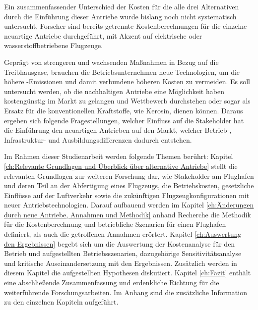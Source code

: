 Ein zusammenfassender Unterschied der Kosten für die alle drei Alternativen durch die Einführung dieser Antriebe 
wurde bislang noch nicht systematisch
untersucht. Forscher sind bereits getrennte Kostenberechnungen für die einzelne neuartige Antriebe durchgeführt, mit Akzent auf
elektrische oder wasserstoffbetriebene Flugzeuge. 

Geprägt von strengeren und wachsenden Maßnahmen in Bezug auf die Treibhausgase, brauchen die Betriebsunternehmen neue Technologien, um die  
höhere -Emissionen und damit verbundene höheren Kosten zu vermeiden.
Es soll untersucht werden, ob die nachhaltigen Antriebe eine Möglichkeit haben kostengünstig im Markt zu gelangen und Wettbewerb durchstehen oder 
sogar als Ersatz für die konventionellen Kraftstoffe, wie Kerosin, dienen können. 
Daraus ergeben sich folgende Fragestellungen, welcher Einfluss auf die Stakeholder hat die Einführung den neuartigen Antrieben auf den Markt, welcher Betrieb-, Infrastruktur- und Ausbildungsdifferenzen dadurch entstehen.

Im Rahmen dieser Studienarbeit werden folgende Themen berührt:
Kapitel \ref{ch:Relevante Grundlagen und Überblick über alternative Antriebe} stellt die relevanten Grundlagen zur weiteren Forschung dar, wie Stakeholder am Flughafen und deren Teil an der Abfertigung eines Flugzeugs,
die Betriebskosten, gesetzliche Einflüsse auf der Luftverkehr sowie die zukünftigen Flugzeugkonfigurationen mit neuer Antriebstechnologien.
Darauf aufbauend werden im Kapitel \ref{ch:Änderungen durch neue Antriebe, Annahmen und Methodik} anhand Recherche die Methodik für die Kostenberechnung und betriebliche Szenarien für einen Flughafen definiert, 
als auch die getroffenen Annahmen erörtert.
Kapitel \ref{ch:Auswertung den Ergebnissen} begebt sich um die Auswertung der Kostenanalyse für den Betrieb und aufgestellten Betriebsszenarien, dazugehörige Sensitivitätsanalyse und
kritische Auseinandersetzung mit den Ergebnissen. Zusätzlich werden in diesem Kapitel die aufgestellten Hypothesen diskutiert.
%
Kapitel \ref{ch:Fazit} enthält eine abschließende Zusammenfassung und erdenkliche Richtung für die weiterführende Forschungsarbeiten.
Im Anhang sind die zusätzliche Information zu den einzelnen Kapiteln aufgeführt.
